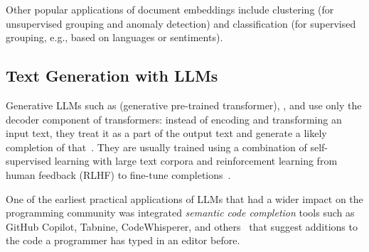 Other popular applications of document embeddings include clustering (for unsupervised grouping and anomaly detection) and classification (for supervised grouping, e.g., based on languages or sentiments).

\subsection{Text Generation with LLMs}
\label{sec:background/semtec/generation}

Generative LLMs such as  (generative pre-trained transformer), , and  use only the decoder component of transformers:
instead of encoding and transforming an input text, they treat it as a part of the output text and generate a likely completion of that~\cite{radford2018improving,openai2024gpt4}.
They are usually trained using a combination of self-supervised learning with large text corpora and reinforcement learning from human feedback (RLHF) to fine-tune completions~\cite{ouyang2022training}.

One of the earliest practical applications of LLMs that had a wider impact on the programming community was integrated \emph{semantic code completion} tools such as GitHub Copilot, Tabnine, CodeWhisperer, and others~\cite{chen2021evaluating,barka2023grounded} that suggest additions to the code a programmer has typed in an editor before.

